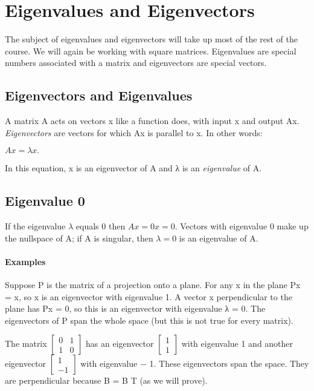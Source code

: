 \documentclass{book}
\begin{document}
\section*{Eigenvalues and Eigenvectors}

      The subject of eigenvalues and eigenvectors will take up most of the rest of the course. We will again be working with square matrices.
 Eigenvalues are special numbers associated with a matrix and eigenvectors are special vectors.
    \subsection*{Eigenvectors and Eigenvalues}

      A matrix A acts on vectors x like a function does, with input x and output Ax. \emph{Eigenvectors} are vectors for which Ax is parallel
 to x.
In other words:
              
                   $Ax = \lambda x.$

 In this equation, x is an eigenvector of A and λ is an \emph{eigenvalue} of A.      

     \subsection*{Eigenvalue 0}
   
    If the eigenvalue $\lambda $ equals 0 then $Ax = 0x = 0.$ Vectors with eigenvalue 0 make up the nullspace of A; if A is singular, then $\lambda  = 0$ is an
eigenvalue of A.      

\paragraph*{Examples}

     Suppose P is the matrix of a projection onto a plane. For any x in the plane Px = x, so x is an eigenvector with eigenvalue 1. A vector x perpendicular to  the plane has Px = 0, so this is an eigenvector with eigenvalue λ = 0. The eigenvectors of P span the whole space (but this
is not true for every matrix).    

The matrix  
$\begin{bmatrix}
  0 & 1\\ 
  1 & 0
\end{bmatrix}$ 
has an eigenvector
$\begin{bmatrix}
  1 \\
  1
\end{bmatrix}$ 
with eigenvalue 1 and another eigenvector
$\begin{bmatrix}
   1 \\
  -1
\end{bmatrix}$
with eigenvalue − 1. These eigenvectors span the space. They are perpendicular because B = B T (as we will prove).
\end{document}
